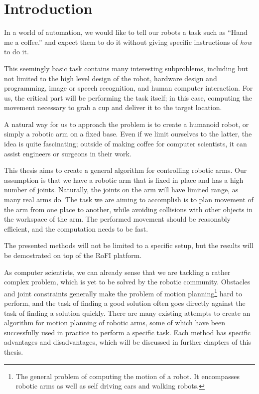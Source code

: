 \chapter{Introduction}


In a world of automation, we would like to tell our robots a task such
as \enquote{Hand me a coffee.} and expect them to do it without giving
specific instructions of \textit{how} to do it.

This seemingly basic task contains many interesting subproblems, including but not limited to
the high level design of the robot, hardware design and programming, image or speech recognition, and human computer interaction.
For us, the critical part will be performing the task itself; in this case, computing the movement necessary to grab a cup and deliver it to the target location.

A natural way for us to approach the problem is to create a humanoid robot, or simply a robotic arm on a fixed base. Even if we limit ourselves to the latter, the idea is quite fascinating; outside of making coffee for computer scientists, it can assist engineers or surgeons in their work.

This thesis aims to create a general algorithm for controlling robotic arms.
Our assumption is that we have a robotic arm that is fixed in place and has a high number of joints.
Naturally, the joints on the arm will have limited range, as many real arms do.
The task we are aiming to accomplish is to plan movement of the arm from one place to another, while avoiding collisions with other objects in the workspace of the arm.
The performed movement should be reasonably efficient, and the computation needs to be fast.

The presented methods will not be limited to a specific setup, but the results will be demostrated on top of the RoFI platform\cite{rofiPlatform}.

As computer scientists, we can already sense that we are tackling a rather complex problem, which is yet to be solved by the robotic community. Obstacles and joint constraints generally make the problem of motion planning\footnote{The general problem of computing the motion of a robot. It encompasses robotic arms as well as self driving cars and walking robots.} hard to perform, and the task of finding a good solution often goes directly against the task of finding a solution quickly.
There are many existing attempts to create an algorithm for motion planning of robotic arms,
some of which have been successfully used in practice to perform a specific task. Each method has specific advantages and disadvantages, which will be discussed in further chapters of this thesis.

